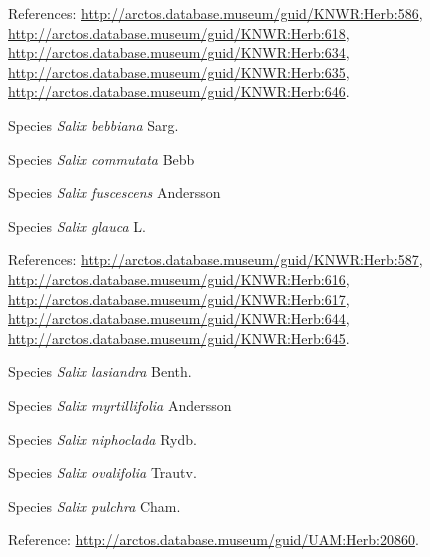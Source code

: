 \documentclass[9pt, article]{memoir}
\begin{document}
\begin{multicols}{2}
\vspace{6pt}References: 
\url{http://arctos.database.museum/guid/KNWR:Herb:586}, 
\url{http://arctos.database.museum/guid/KNWR:Herb:618}, 
\url{http://arctos.database.museum/guid/KNWR:Herb:634}, 
\url{http://arctos.database.museum/guid/KNWR:Herb:635}, 
\url{http://arctos.database.museum/guid/KNWR:Herb:646}.

\vspace{6pt}\noindent\hspace{36pt}Species \textit{Salix bebbiana} Sarg.


\vspace{6pt}\noindent\hspace{36pt}Species \textit{Salix commutata} Bebb


\vspace{6pt}\noindent\hspace{36pt}Species \textit{Salix fuscescens} Andersson


\vspace{6pt}\noindent\hspace{36pt}Species \textit{Salix glauca} L.


\vspace{6pt}References: 
\url{http://arctos.database.museum/guid/KNWR:Herb:587}, 
\url{http://arctos.database.museum/guid/KNWR:Herb:616}, 
\url{http://arctos.database.museum/guid/KNWR:Herb:617}, 
\url{http://arctos.database.museum/guid/KNWR:Herb:644}, 
\url{http://arctos.database.museum/guid/KNWR:Herb:645}.

\vspace{6pt}\noindent\hspace{36pt}Species \textit{Salix lasiandra} Benth.


\vspace{6pt}\noindent\hspace{36pt}Species \textit{Salix myrtillifolia} Andersson


\vspace{6pt}\noindent\hspace{36pt}Species \textit{Salix niphoclada} Rydb.


\vspace{6pt}\noindent\hspace{36pt}Species \textit{Salix ovalifolia} Trautv.


\vspace{6pt}\noindent\hspace{36pt}Species \textit{Salix pulchra} Cham.


\vspace{6pt}Reference: 
\url{http://arctos.database.museum/guid/UAM:Herb:20860}.


\end{multicols}
\end{document}
